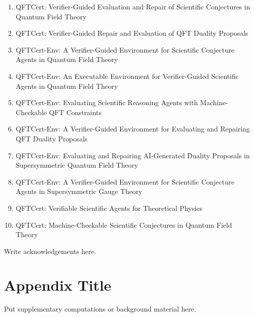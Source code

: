\documentclass[11pt]{scrartcl}
\begin{document}
\begin{enumerate}
    \item QFTCert: Verifier-Guided Evaluation and Repair of Scientific Conjectures in Quantum Field Theory

    \item QFTCert: Verifier-Guided Repair and Evaluation of QFT Duality Proposals

    \item QFTCert-Env: A Verifier-Guided Environment for Scientific Conjecture Agents in Quantum Field Theory

    \item QFTCert-Env: An Executable Environment for Verifier-Guided Scientific Agents in Quantum Field Theory

    \item QFTCert-Env: Evaluating Scientific Reasoning Agents with Machine-Checkable QFT Constraints

    \item QFTCert-Env: A Verifier-Guided Environment for Evaluating and Repairing QFT Duality Proposals

    \item QFTCert-Env: Evaluating and Repairing AI-Generated Duality Proposals in Supersymmetric Quantum Field Theory

    \item QFTCert-Env: A Verifier-Guided Environment for Scientific Conjecture Agents in Supersymmetric Gauge Theory

    \item QFTCert: Verifiable Scientific Agents for Theoretical Physics

    \item QFTCert: Machine-Checkable Scientific Conjectures in Quantum Field Theory

\end{enumerate}




Write acknowledgements here.

\appendix

\section{Appendix Title}
\label{app:appendix-title}

Put supplementary computations or background material here.

\printbibliography[heading=bibliography]
\end{document}
